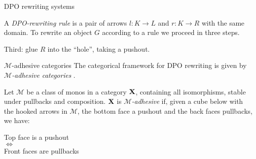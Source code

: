 \documentclass{beamer}
\def\X{\textbf {\textup{X}}}
\begin{document}
\begin{frame}{DPO rewriting systems}
\begin{overprint}
	A \emph{DPO-rewriting rule} is a pair  of arrows $l:K\to L$ and $r:K\to R$ with the same domain. To rewrite an object $G$ according to a rule we proceed in three steps.
		
		\medskip
		Third: glue $R$ into the ``hole'',  taking a pushout.\vspace{-0.075cm}
		\begin{center}\hspace{0.08cm}
		\end{center}		
	\end{overprint}  	
\end{frame}




\begin{frame}{$\mathcal{M}$-adhesive categories}
	The categorical framework for DPO rewriting is given by \emph{$\mathcal{M}$-adhesive categories} \cite{azzi2019essence,ehrig2014adhesive, lack2005adhesive}.
		
		\medskip \pause
		Let $\mathcal{M}$ be a class of monos in a category $\X$, containing all isomorphisms, stable under pullbacks and composition. $\X$ is \emph{$\mathcal{M}$-adhesive} if, given a cube below with the hooked arrows in $\mathcal{M}$, the bottom face a pushout and the back faces pullbacks, we have:
		
		\parbox{5cm}{\centering {}} \quad 	\parbox{4cm}{\centering
			Top face is a pushout \\ $\iff$ \\ Front faces are pullbacks}
			

\end{frame}
\end{document}
